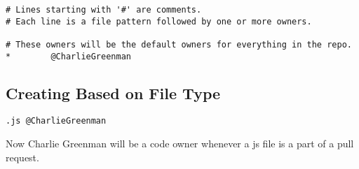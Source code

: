 \begin{lstlisting}
# Lines starting with '#' are comments.
# Each line is a file pattern followed by one or more owners.

# These owners will be the default owners for everything in the repo.
*        @CharlieGreenman

\end{lstlisting}

\subsection{ Creating \codeowners{} Based on File Type }
\begin{lstlisting}
.js @CharlieGreenman
\end{lstlisting}

Now Charlie Greenman will be a code owner whenever a js file is a part of a
pull request.

